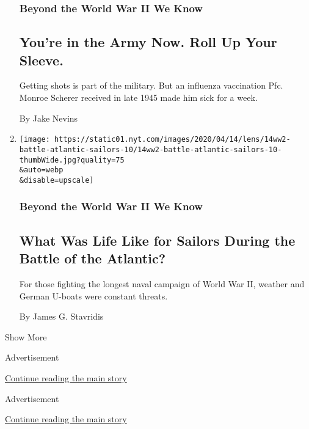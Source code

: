 \begin{enumerate}
{  \subsubsection{Beyond the World War II We
  Know}\label{beyond-the-world-war-ii-we-know-12}}

  \hypertarget{youre-in-the-army-now-roll-up-your-sleeve}{%
  \subsection{You're in the Army Now. Roll Up Your
  Sleeve.}\label{youre-in-the-army-now-roll-up-your-sleeve}}

  Getting shots is part of the military. But an influenza vaccination
  Pfc. Monroe Scherer received in late 1945 made him sick for a week.

  By Jake Nevins
\item
  \href{/2020/04/14/magazine/world-war-ii-battle-of-atlantic-sailors.html}{}

  \texttt{[image: https://static01.nyt.com/images/2020/04/14/lens/14ww2-battle-atlantic-sailors-10/14ww2-battle-atlantic-sailors-10-thumbWide.jpg?quality=75\\\&auto=webp\\\&disable=upscale]}

  \hypertarget{beyond-the-world-war-ii-we-know-13}{%
  \subsubsection{Beyond the World War II We
  Know}\label{beyond-the-world-war-ii-we-know-13}}

  \hypertarget{what-was-life-like-for-sailors-during-the-battle-of-the-atlantic}{%
  \subsection{What Was Life Like for Sailors During the Battle of the
  Atlantic?}\label{what-was-life-like-for-sailors-during-the-battle-of-the-atlantic}}

  For those fighting the longest naval campaign of World War II, weather
  and German U-boats were constant threats.

  By James G. Stavridis
\end{enumerate}

Show More

Advertisement

\protect\hyperlink{after-mid1}{Continue reading the main story}

Advertisement

\protect\hyperlink{after-mktg}{Continue reading the main story}

